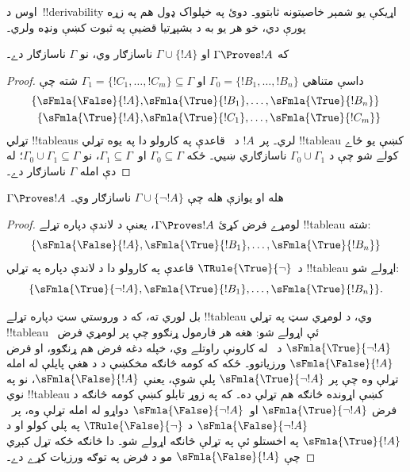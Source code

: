 \documentclass[../../../include/open-logic-section]{subfiles}
\begin{document}
      {}
      {}


اوس د~!!{derivability} اړيکې يو شمېر خاصيتونه ثابتوو۔ دوئ په
خپلواک ډول هم په زړه پورې دي، خو هر يو به د بشپړتيا قضیې په ثبوت
کښې ونډه ولري۔

\begin{prop}
  که $\Gamma \Proves !A$ او $\Gamma \cup \{!A\}$ ناسازګار وي،
  نو $\Gamma$ ناسازګار دے۔
\end{prop}

\begin{proof}
داسې متناهي
$\Gamma_0 = \{!B_1, \dots, !B_n\}$ او
$\Gamma_1 =\{!C_1, \dots, !C_m\} \subseteq \Gamma$ شته چې
  \begin{align*}
    \{\sFmla{\False}{!A}, &
    \sFmla{\True}{!B_1}, \dots, \sFmla{\True}{!B_n}\} \\
    \{\sFmla{\True}{!A}, &
    \sFmla{\True}{!C_1}, \dots, \sFmla{\True}{!C_m}\}
  \end{align*}
  تړلي !!{tableau}s لري۔ پر~$!A$ د~\Cut{} قاعدې په کارولو دا په
  يوه تړلي !!{tableau} کښې يو ځاے کولے شو چې د
  $\Gamma_0 \cup \Gamma_1$ ناسازګاري ښيي۔ ځکه
  $\Gamma_0 \subseteq \Gamma$ او~$\Gamma_1 \subseteq \Gamma$،
  نو $\Gamma_0 \cup \Gamma_1 \subseteq \Gamma$؛ له دې امله
  $\Gamma$ ناسازګار دے۔
\end{proof}

\begin{prop}
$\Gamma \Proves !A$ هله او يوازې هله چې
$\Gamma \cup \{\lnot !A\}$ ناسازګار وي۔
\end{prop}

\begin{proof}
لومړے فرض کړئ $\Gamma \Proves !A$، يعنې د لاندې دپاره تړلے
!!{tableau} شته:
\[
\{\sFmla{\False}{!A},
\sFmla{\True}{!B_1}, \dots, \sFmla{\True}{!B_n}\}
\]
د~$\TRule{\True}{\lnot}$ قاعدې په کارولو دا د لاندې دپاره په تړلي
!!{tableau} اړولے شو:
\[
\{\sFmla{\True}{\lnot !A},
\sFmla{\True}{!B_1}, \dots, \sFmla{\True}{!B_n}\}.
\]

بل لوري ته، که د وروستي سټ دپاره تړلے !!{tableau} وي، د لومړي سټ
په تړلي !!{tableau} ئې اړولے شو: هغه هر فارمول ړنګوو چې پر لومړي
فرض~$\sFmla{\True}{\lnot !A}$ د~\TRule{\True}{\lnot} له کارونې
راوتلے وي، خپله دغه فرض هم ړنګوو، او فرض
$\sFmla{\False}{!A}$ ورزياتوو۔ ځکه که کومه څانګه مخکښې د
\TRule{\True}{\lnot} د هغې پايلې له امله تړلې وه چې پر
$\sFmla{\True}{\lnot !A}$ پلې شوې، يعنې
$\sFmla{\False}{!A}$، نو په نوي !!{tableau} کښې اړونده څانګه هم
تړلې ده۔ که په زوړ تابلو کښې کومه څانګه د فرض
$\sFmla{\True}{\lnot !A}$ او~$\sFmla{\False}{\lnot !A}$ دواړو له
امله تړلې وه، پر~$\sFmla{\False}{\lnot !A}$ د
$\TRule{\False}{\lnot}$ په پلي کولو او د
$\sFmla{\True}{!A}$ په اخستلو ئې په تړلې څانګه اړولے شو۔ دا څانګه
ځکه تړل کېږي چې $\sFmla{\False}{!A}$ مو د فرض په توګه ورزيات کړے
دے۔
\end{proof}
\end{document}
